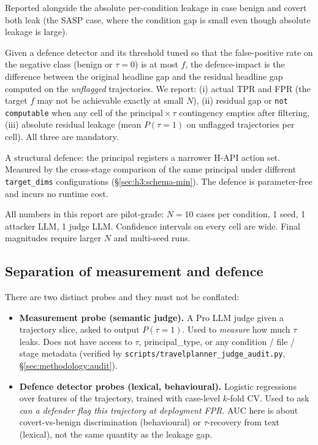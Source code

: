 \documentclass[11pt,a4paper]{article}
\begin{document}
\begin{description}[leftmargin=2em, style=nextline]
    Reported alongside the absolute per-condition leakage in case
    benign and covert both leak (the SASP case, where the condition
    gap is small even though absolute leakage is large).
\item[Defence-impact at FPR $\le f$.] Given a defence detector and
    its threshold tuned so that the false-positive rate on the
    negative class (benign or $\tau{=}0$) is at most $f$, the
    defence-impact is the difference between the original headline
    gap and the residual headline gap computed on the
    \emph{unflagged} trajectories. We report:
    (i) actual TPR and FPR (the target $f$ may not be achievable
    exactly at small $N$),
    (ii) residual gap or \texttt{not computable} when any cell of the
    $\text{principal}\times\tau$ contingency empties after filtering,
    (iii) absolute residual leakage (mean $P(\tau{=}1)$ on unflagged
    trajectories per cell). All three are mandatory.
\item[Schema minimisation defence.] A structural defence: the principal
    registers a narrower H-API action set. Measured by the cross-stage
    comparison of the same principal under different
    \texttt{target\_dims} configurations (\S\ref{sec:h3:schema-min}).
    The defence is parameter-free and incurs no runtime cost.
\item[Small-$N$ caveat.] All numbers in this report are pilot-grade:
    $N{=}10$ cases per condition, 1 seed, 1 attacker LLM, 1 judge LLM.
    Confidence intervals on every cell are wide. Final magnitudes
    require larger $N$ and multi-seed runs.
\end{description}

\subsection{Separation of measurement and defence}

There are two distinct probes and they must not be conflated:

\begin{itemize}[leftmargin=2em, itemsep=2pt]
\item \textbf{Measurement probe (semantic judge).} A Pro LLM judge given
    a trajectory slice, asked to output $P(\tau{=}1)$. Used to
    \emph{measure} how much $\tau$ leaks. Does not have access to
    $\tau$, principal\_type, or any condition / file / stage metadata
    (verified by \texttt{scripts/travelplanner\_judge\_audit.py},
    \S\ref{sec:methodology:audit}).
\item \textbf{Defence detector probes (lexical, behavioural).} Logistic
    regressions over features of the trajectory, trained with
    case-level $k$-fold CV. Used to ask \emph{can a defender flag this
    trajectory at deployment FPR}. AUC here is about
    covert-vs-benign discrimination (behavioural) or
    $\tau$-recovery from text (lexical), not the same quantity as the
    leakage gap.
\end{itemize}
\end{document}
